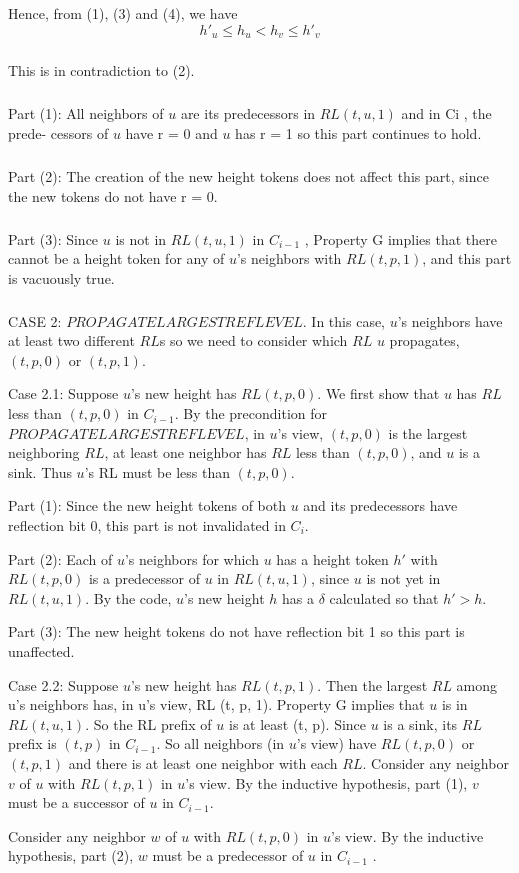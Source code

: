 Hence, from (1), (3) and (4), we have
\begin{equation}
h'_u \leq h_u < h_v \leq h'_v
\end{equation}
\subparagraph{}This is in contradiction to (2).
\subparagraph{}Part (1): All neighbors of $u$ are its predecessors in $RL (t, u, 1)$ and in Ci , the prede- cessors of $u$ have r = 0 and $u$ has r = 1 so this part continues to hold.
\subparagraph{}Part (2): The creation of the new height tokens does not affect this part, since the new tokens do not have r = 0.
\subparagraph{}Part (3): Since $u$ is not in $RL (t, u, 1)$ in $C_{i-1}$ , Property G implies that there cannot be a height token for any of $u$'s neighbors with $RL (t, p, 1)$, and this part is vacuously true.
\subparagraph{}CASE 2: $PROPAGATELARGESTREFLEVEL$. In this case, $u$'s neighbors have at least two different $RL$s so we need to consider which $RL$ $u$ propagates, $(t, p, 0)$ or $(t, p, 1)$.

Case 2.1: Suppose $u$'s new height has $RL (t, p, 0)$. We first show that $u$ has $RL$ less than $(t, p, 0)$ in $C_{i-1}$. By the precondition for $PROPAGATELARGESTREFLEVEL$, in $u$'s view, $(t, p, 0)$ is the largest neighboring $RL$, at least one neighbor has $RL$ less than $(t, p, 0)$, and $u$ is a sink. Thus $u$'s RL must be less than $(t, p, 0)$.

Part (1): Since the new height tokens of both $u$ and its predecessors have reflection bit $0$, this part is not invalidated in $C_i$.

Part (2): Each of $u$'s neighbors for which $u$ has a height token $h'$ with $RL (t, p, 0)$ is a predecessor of $u$ in $RL (t, u, 1)$, since $u$ is not yet in $RL (t, u, 1)$. By the code, $u$'s new height $h$ has a $\delta$ calculated so that $h' > h$.

Part (3): The new height tokens do not have reflection bit 1 so this part is unaffected.

Case 2.2: Suppose $u$'s new height has $RL (t, p, 1)$. Then the largest $RL$ among u's neighbors has, in u's view, RL (t, p, 1). Property G implies that $u$ is in $RL (t, u, 1)$. So the RL prefix of $u$ is at least (t, p). Since $u$ is a sink, its $RL$ prefix is $(t, p)$ in $C_{i-1}$. So all neighbors (in $u$'s view) have $RL (t, p, 0)$ or $(t, p, 1)$ and there is at least one neighbor with each $RL$. Consider any neighbor $v$ of $u$ with $RL (t, p, 1)$ in $u$'s view. By the inductive hypothesis, part (1), $v$ must be a successor of $u$ in $C_{i-1}$.

Consider any neighbor $w$ of $u$ with $RL (t, p, 0)$ in $u$'s view. By the inductive hypothesis, part (2), $w$ must be a predecessor of $u$ in $C_{i-1}$ .

